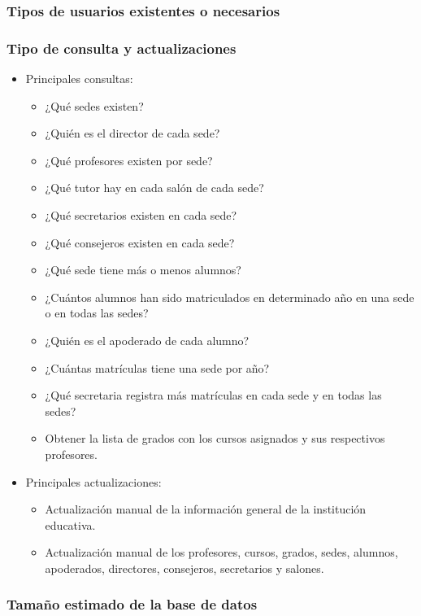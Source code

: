 \subsubsection{Tipos de usuarios existentes o necesarios}
\subsubsection{Tipo de consulta y actualizaciones}
\begin{itemize}
	\item Principales consultas:
	      \begin{itemize}
		      \item ¿Qué sedes existen?
		      \item ¿Quién es el director de cada sede?
		      \item ¿Qué profesores existen por sede?
		      \item ¿Qué tutor hay en cada salón de cada sede?
		      \item ¿Qué secretarios existen en cada sede?
		      \item ¿Qué consejeros existen en cada sede?
		      \item ¿Qué sede tiene más o menos alumnos?
		      \item ¿Cuántos alumnos han sido matriculados en determinado año en una sede o en todas las sedes?
		      \item ¿Quién es el apoderado de cada alumno?
		      \item ¿Cuántas matrículas tiene una sede por año?
		      \item ¿Qué secretaria registra más matrículas en cada sede y en todas las sedes?
		      \item Obtener la lista de grados con los cursos asignados y sus respectivos profesores.
	      \end{itemize}
	\item Principales actualizaciones:
	      \begin{itemize}
		      \item Actualización manual de la información general de la institución educativa.
		      \item Actualización manual de los profesores, cursos, grados, sedes, alumnos, apoderados, directores, consejeros, secretarios y salones.
	      \end{itemize}
\end{itemize}
\subsubsection{Tamaño estimado de la base de datos}




